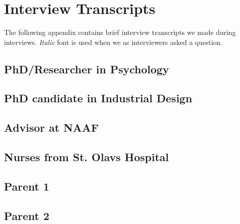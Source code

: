 \chapter{Interview Transcripts}

\label{app:interview-transcripts}

The following appendix contains brief interview transcripts we made during interviews. \emph{Italic} font is used when we as interviewers asked a question. 

\section{PhD/Researcher in Psychology}
\label{sec:psychinterview}

\clearpage

\section{PhD candidate in Industrial Design}
\label{sec:marikkeninterview}

\clearpage

\section{Advisor at NAAF}
\label{sec:roseinterview}

\clearpage{}

\section{Nurses from St. Olavs Hospital}
\label{sec:nursesinterview}

\clearpage{}

\section{Parent 1}
\label{sec:parent1interview}

\clearpage{}

\section{Parent 2}
\label{sec:parent2interview}

\clearpage{}